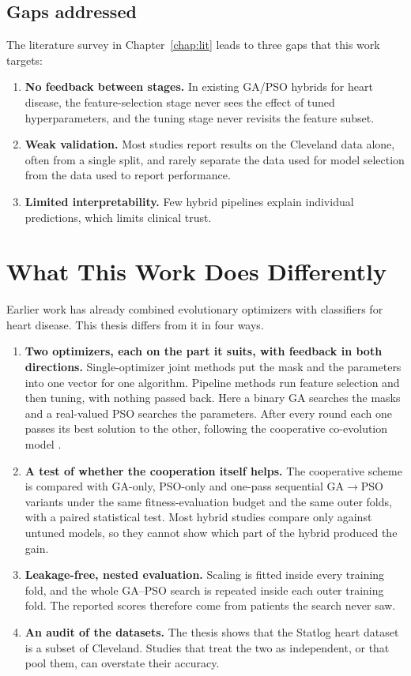 \documentclass[MTech]{ugthesis}
\begin{document}
\subsection{Gaps addressed}
The literature survey in Chapter~\ref{chap:lit} leads to three gaps that this work targets:
\begin{enumerate}
\item \textbf{No feedback between stages.} In existing GA/PSO hybrids for heart disease, the feature-selection stage never sees the effect of tuned hyperparameters, and the tuning stage never revisits the feature subset.
\item \textbf{Weak validation.} Most studies report results on the Cleveland data alone, often from a single split, and rarely separate the data used for model selection from the data used to report performance.
\item \textbf{Limited interpretability.} Few hybrid pipelines explain individual predictions, which limits clinical trust.
\end{enumerate}

\section{What This Work Does Differently}
\label{sec:novelty}
Earlier work has already combined evolutionary optimizers with classifiers for heart disease. This thesis differs from it in four ways.
\begin{enumerate}
\item \textbf{Two optimizers, each on the part it suits, with feedback in both directions.} Single-optimizer joint methods \citep{huang2006gasvm,lin2008psosvm,abdar2019n2genetic} put the mask and the parameters into one vector for one algorithm. Pipeline methods \citep{cao2025dlpso,warsi2024gasvm} run feature selection and then tuning, with nothing passed back. Here a binary GA searches the masks and a real-valued PSO searches the parameters. After every round each one passes its best solution to the other, following the cooperative co-evolution model \citep{potter1994cc,ma2019ccsurvey}.
\item \textbf{A test of whether the cooperation itself helps.} The cooperative scheme is compared with GA-only, PSO-only and one-pass sequential GA$\rightarrow$PSO variants under the same fitness-evaluation budget and the same outer folds, with a paired statistical test. Most hybrid studies compare only against untuned models, so they cannot show which part of the hybrid produced the gain.
\item \textbf{Leakage-free, nested evaluation.} Scaling is fitted inside every training fold, and the whole GA--PSO search is repeated inside each outer training fold. The reported scores therefore come from patients the search never saw.
\item \textbf{An audit of the datasets.} The thesis shows that the Statlog heart dataset is a subset of Cleveland. Studies that treat the two as independent, or that pool them, can overstate their accuracy.
\end{enumerate}
\end{document}
